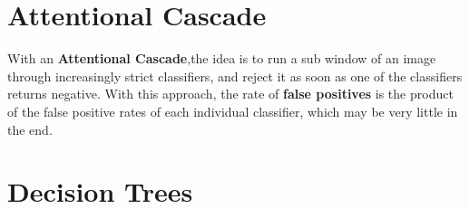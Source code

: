 \documentclass{tufte-handout}
\begin{document}
\section{Attentional Cascade}
With an \textbf{Attentional Cascade},the idea is to run a sub window of an image through increasingly strict
classifiers, and reject it as soon as one of the classifiers returns negative. With this approach, the rate
of \textbf{false positives} is the product of the false positive rates of each individual classifier, which may
be very little in the end.
\section{Decision Trees}
\end{document}
